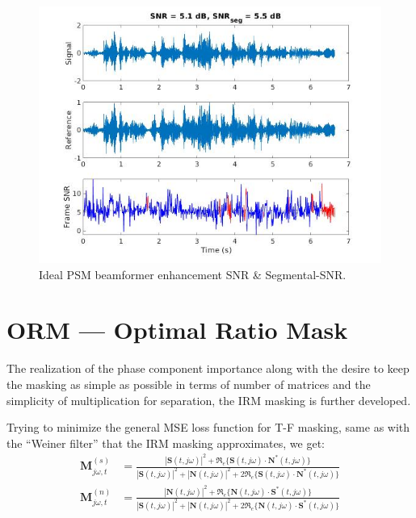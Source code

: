 \begin{figure}[H]
    \centering
    \includegraphics[width=\linewidth]{Features/images/psm_ideal_snr}
    \caption{Ideal PSM beamformer enhancement SNR \& Segmental-SNR.}\label{fig:psm_ideal_snr}
\end{figure}



\section{ORM --- Optimal Ratio Mask}
The realization of the phase component importance along with 
the desire to keep the masking as simple as possible in terms of number 
of matrices and the simplicity of multiplication for separation,
the IRM masking is further developed.

Trying to minimize the general MSE loss function for T-F masking,
same as with the ``Weiner filter'' that the IRM masking approximates, we get:
\begin{align}
    \mathbf{M}^{(s)}_{j\omega, t} & = \frac{
        |\mathbf{S}(t,j\omega)|^{2}
        + \mathfrak{R}_{e}\{ \mathbf{S}(t,j\omega) \cdot {\mathbf{N}}^{*}(t,j\omega) \}
        }{
            |\mathbf{S}(t,j\omega)|^{2} 
            + |\mathbf{N}(t,j\omega)|^{2}
            + 2 \mathfrak{R}_{e}\{ \mathbf{S}(t,j\omega) \cdot {\mathbf{N}}^{*}(t,j\omega) \} 
        } \\
    \mathbf{M}^{(n)}_{j\omega, t} & = \frac{
        |\mathbf{N}(t,j\omega)|^{2}
        + \mathfrak{R}_{e}\{ \mathbf{N}(t,j\omega) \cdot {\mathbf{S}}^{*}(t,j\omega) \}
        }{
            |\mathbf{S}(t,j\omega)|^{2} 
            + |\mathbf{N}(t,j\omega)|^{2}
            + 2 \mathfrak{R}_{e}\{ \mathbf{N}(t,j\omega) \cdot {\mathbf{S}}^{*}(t,j\omega) \} 
        }
\end{align}


